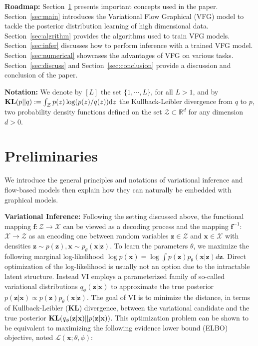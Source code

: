 \documentclass[sigconf, anonymous, review]{acmart}
\theoremstyle{plain}
\theoremstyle{definition}
\theoremstyle{remark}
\begin{document}
\noindent\textbf{Roadmap:} Section~\ref{sec:prelim} presents important concepts used in the paper.
Section~\ref{sec:main} introduces the Variational Flow Graphical  (VFG) model to tackle the posterior distribution learning of high dimensional data.
Section~\ref{sec:algrithm} provides the algorithms used to train VFG models. 
Section~\ref{sec:infer} discusses how to perform inference with a trained VFG model. Section~\ref{sec:numerical} showcases the advantages of VFG on various tasks. Section~\ref{sec:discuss} and Section~\ref{sec:conclusion} provide a discussion and conclusion of the paper.

\vspace{0.05in}
\noindent\textbf{Notation:} We denote by $[L]$ the set $ \{1, \cdots, L\}$, for all $L >1$, and by $\textbf{\text{KL}}(p || q ) := \int_{\mathcal{Z}} p(z) \log(p(z)/q(z)) \mathrm{d}z$ the Kullback-Leibler divergence from $q$ to $p$, two probability density functions defined on the set $\mathcal{Z} \subset \mathbb{R}^d$ for any dimension $d >0$.

\vspace{-0.05in}
\section{Preliminaries}\label{sec:prelim}
\vspace{-0.05in}
We introduce the general principles and notations of  variational inference  and  flow-based models then explain how they can naturally be embedded with graphical models.

\textbf{Variational Inference:}
Following the setting discussed above, the functional mapping $\mathbf{f}: \mathcal{Z} \xrightarrow{} \mathcal{X} $ can be viewed as a decoding process and the mapping $\mathbf{f}^{-1}$: $ \mathcal{X} \xrightarrow{}  \mathcal{Z}$ as an encoding one between  random variables $\mathbf{z} \in \mathcal{Z}$  and $\mathbf{x} \in \mathcal{X}$ with densities $\mathbf{z} \sim p(\mathbf{z}), \mathbf{x} \sim p_{\theta}(\mathbf{x}|\mathbf{z}).$
To learn the parameters $\theta$, we maximize the following marginal log-likelihood $ \log p(\mathbf{x}) = \log \int p(\mathbf{z})  p_{\theta}(\mathbf{x}|\mathbf{z})d\mathbf{z}$.
Direct optimization of the log-likelihood is usually not an option due to the intractable latent structure. Instead VI employs a parameterized family of so-called variational distributions $q_{\phi}(\mathbf{z}|\mathbf{x})$ to approximate the true posterior $p(\mathbf{z}|\mathbf{x}) \varpropto  p(\mathbf{z})  p_{\theta}(\mathbf{x}|\mathbf{z})$.
The goal of VI is to minimize the distance, in terms of Kullback-Leibler ($\mathbf{KL}$) divergence, between the variational candidate and the true posterior $\textbf{\text{KL}}(q_{\phi}(\mathbf{z}|\mathbf{x})||p(\mathbf{z}|\mathbf{x}) )$.
This optimization problem can be shown to be equivalent to maximizing the following evidence lower bound (ELBO) objective, noted $\mathcal{L}(\mathbf{x}; \theta, \phi)$: 
\end{document}
